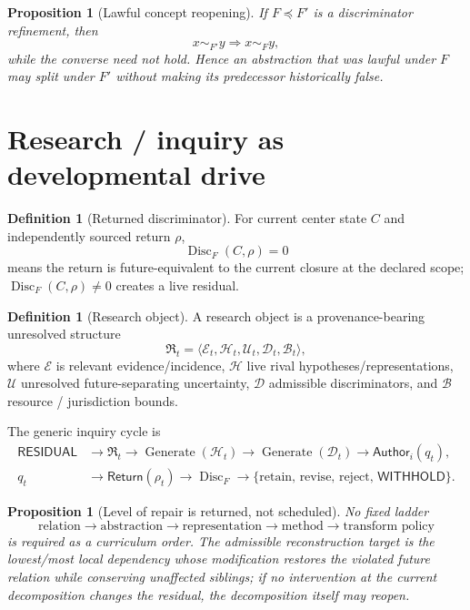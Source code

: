 \documentclass[10pt]{article}
\theoremstyle{venus}
\newtheorem{proposition}[theorem]{Proposition}
\theoremstyle{definition}
\newtheorem{definition}[theorem]{Definition}
\newcommand{\Disc}{\operatorname{Disc}}
\newcommand{\Generate}{\operatorname{Generate}}
\newcommand{\Return}{\mathsf{Return}}
\newcommand{\Author}{\mathsf{Author}}
\newcommand{\Withhold}{\mathsf{WITHHOLD}}
\newcommand{\ResidualState}{\mathsf{RESIDUAL}}
\begin{document}
\begin{proposition}[Lawful concept reopening]
If $F\preceq F'$ is a discriminator refinement, then
\[
x\sim_{F'}y\Longrightarrow x\sim_Fy,
\]
while the converse need not hold. Hence an abstraction that was lawful under
$F$ may split under $F'$ without making its predecessor historically false.
\end{proposition}

\section{Research / inquiry as developmental drive}

\begin{definition}[Returned discriminator]
For current center state $C$ and independently sourced return $\rho$,
\[
\Disc_F(C,\rho)=0
\]
means the return is future-equivalent to the current closure at the declared
scope; $\Disc_F(C,\rho)\neq0$ creates a live residual.
\end{definition}

\begin{definition}[Research object]
A research object is a provenance-bearing unresolved structure
\begin{equation}\label{eq:researchobject}
\mathfrak R_t
=
\langle
\mathcal E_t,\mathcal H_t,\mathcal U_t,\mathcal D_t,\mathcal B_t
\rangle,
\end{equation}
where $\mathcal E$ is relevant evidence/incidence, $\mathcal H$ live rival
hypotheses/representations, $\mathcal U$ unresolved future-separating
uncertainty, $\mathcal D$ admissible discriminators, and $\mathcal B$ resource /
jurisdiction bounds.
\end{definition}

The generic inquiry cycle is
\begin{equation}\label{eq:researchcycle}
\begin{aligned}
\ResidualState&\to\mathfrak R_t
\to\Generate(\mathcal H_t)
\to\Generate(\mathcal D_t)
\to\Author_i(q_t),\\
q_t&\to\Return(\rho_t)
\to\Disc_F
\to\{\text{retain, revise, reject, }\Withhold\}.
\end{aligned}
\end{equation}

\begin{proposition}[Level of repair is returned, not scheduled]
No fixed ladder
\[
\text{relation}\to\text{abstraction}\to\text{representation}\to\text{method}
\to\text{transform policy}
\]
is required as a curriculum order. The admissible reconstruction target is the
lowest/most local dependency whose modification restores the violated future
relation while conserving unaffected siblings; if no intervention at the
current decomposition changes the residual, the decomposition itself may
reopen.
\end{proposition}
\end{document}
